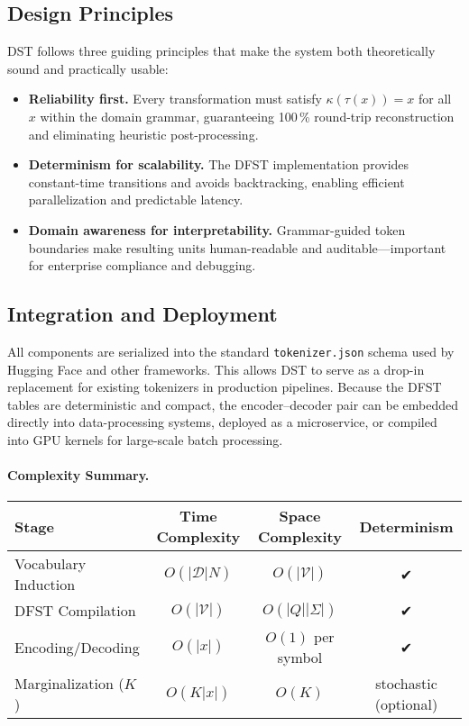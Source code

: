 \subsection{Design Principles}

DST follows three guiding principles that make the system both theoretically sound and practically usable:

\begin{itemize}
  \item \textbf{Reliability first.}
  Every transformation must satisfy $\kappa(\tau(x))=x$ for all $x$ within the domain grammar, guaranteeing 100\,\% round-trip reconstruction and eliminating heuristic post-processing.
  \item \textbf{Determinism for scalability.}
  The DFST implementation provides constant-time transitions and avoids backtracking, enabling efficient parallelization and predictable latency.
  \item \textbf{Domain awareness for interpretability.}
  Grammar-guided token boundaries make resulting units human-readable and auditable—important for enterprise compliance and debugging.
\end{itemize}

\subsection{Integration and Deployment}

All components are serialized into the standard \texttt{tokenizer.json} schema used by Hugging Face and other frameworks.
This allows DST to serve as a drop-in replacement for existing tokenizers in production pipelines.
Because the DFST tables are deterministic and compact, the encoder–decoder pair can be embedded directly into data-processing systems, deployed as a microservice, or compiled into GPU kernels for large-scale batch processing.

\paragraph{Complexity Summary.}
\begin{center}
\begin{tabular}{lccc}
\toprule
Stage & Time Complexity & Space Complexity & Determinism \\
\midrule
Vocabulary Induction & $O(|\mathcal{D}|N)$ & $O(|\mathcal{V}|)$ & ✔ \\
DFST Compilation & $O(|\mathcal{V}|)$ & $O(|Q||\Sigma|)$ & ✔ \\
Encoding/Decoding & $O(|x|)$ & $O(1)$ per symbol & ✔ \\
Marginalization ($K$) & $O(K|x|)$ & $O(K)$ & stochastic (optional) \\
\bottomrule
\end{tabular}
\end{center}

